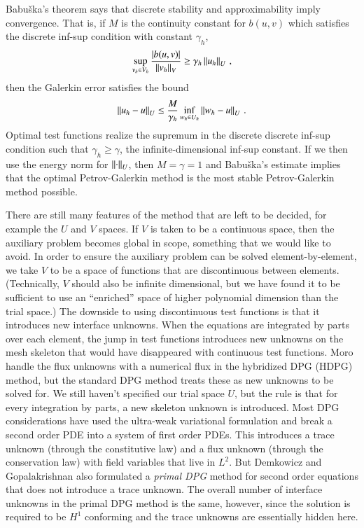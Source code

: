 \documentclass[preprint,12pt]{elsarticle}
\begin{document}
Babu\v{s}ka's theorem\cite{Babuska70} says that discrete stability and approximability imply convergence.
That is, if $M$ is the continuity constant for $b(u,v)$ which satisfies the discrete inf-sup condition with constant $\gamma_h$,
\[
\sup_{v_h\in V_h}\frac{|b(u,v)|}{\left\| v_h \right\|_V}\geq\gamma_h\left\| u_h \right\|_U\,,
\]
then the Galerkin error satisfies the bound
\[
\left\| u_h-u \right\|_U\leq\frac{M}{\gamma_h}\inf_{w_h\in U_h}\left\| w_h-u \right\|_U\,.
\]
Optimal test functions realize the supremum in the discrete discrete inf-sup condition such that $\gamma_h\geq\gamma$, 
the infinite-dimensional inf-sup constant.
If we then use the energy norm for $\left\| \cdot \right\|_U$, then $M=\gamma=1$ and Babu\v{s}ka's estimate implies that
the optimal Petrov-Galerkin method is the most stable Petrov-Galerkin method possible.

There are still many features of the method that are left to be decided, for example the $U$ and $V$ spaces.
If $V$ is taken to be a continuous space, then the auxiliary problem becomes global in scope, something that we would like to avoid.
In order to ensure the auxiliary problem can be solved element-by-element, we take $V$ to be a space of functions that are discontinuous between elements.
(Technically, $V$ should also be infinite dimensional, but we have found it to be sufficient to use an ``enriched'' space of higher
polynomial dimension than the trial space\cite{PracticalDPG}.)
The downside to using discontinuous test functions is that it introduces new interface unknowns.
When the equations are integrated by parts over each element, the jump in test functions introduces new unknowns on the mesh skeleton
that would have disappeared with continuous test functions.
Moro \etal\cite{MoroNguyenPeraire11} handle the flux unknowns with a numerical flux in the hybridized DPG (HDPG) method, but the standard DPG method treats
these as new unknowns to be solved for.
We still haven't specified our trial space $U$, but the rule is that for every integration by parts, a new skeleton unknown is introduced.
Most DPG considerations have used the ultra-weak variational formulation and break a second order PDE into 
a system of first order PDEs. 
This introduces a trace unknown (through the constitutive law) and a flux unknown (through the conservation law) with field variables that live in $L^2$.
But Demkowicz and Gopalakrishnan also formulated 
a \emph{primal DPG} method\cite{PrimalDPG} for second order equations that does not introduce a trace unknown.
The overall number of interface unknowns in the primal DPG method is the same, however, since the solution is required to be $H^1$ conforming 
and the trace unknowns are essentially hidden here.
\end{document}
